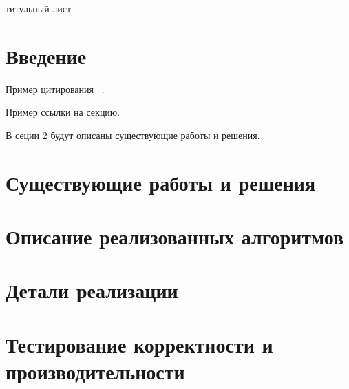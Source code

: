 \documentclass[14pt]{extarticle}
\begin{document}

\thispagestyle{empty}
титульный лист
\pagebreak

\thispagestyle{empty}

\begin{abstract}

Аннотация на русском языке

\end{abstract}
\pagebreak

\thispagestyle{empty}

\begin{abstract}

Abstract in english.

\end{abstract}
\pagebreak


{
\hypersetup{linkcolor=black}
\tableofcontents
}

\pagebreak
\section{Введение}

Пример цитирования ~\cite{GabRam}.

Пример ссылки на секцию.

В сеции \ref{part2} будут описаны существующие работы и решения.

\pagebreak
\section{Существующие работы и решения}\label{part2}

\pagebreak
\section{Описание реализованных алгоритмов}\label{part3}

\pagebreak
\section{Детали реализации}\label{part4}

\pagebreak
\section{Тестирование корректности и производительности}\label{part5}
\end{document}
